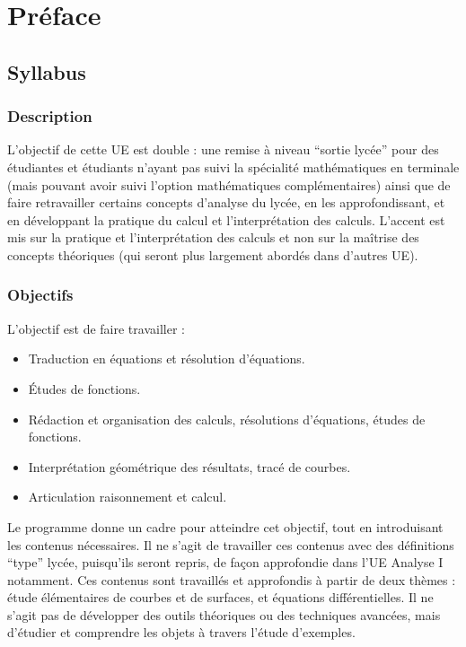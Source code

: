
\chapter*{Préface}


\section*{Syllabus}

\subsection*{Description}

L’objectif de cette UE est double : une remise à niveau “sortie lycée” pour des étudiantes
et étudiants n’ayant pas suivi la spécialité mathématiques en terminale (mais pouvant avoir
suivi l’option mathématiques complémentaires) ainsi que de faire retravailler certains concepts
d’analyse du lycée, en les approfondissant, et en développant la pratique du calcul et 
l’interprétation des calculs. L’accent est mis sur la pratique et l’interprétation des calculs et non
sur la maîtrise des concepts théoriques (qui seront plus largement abordés dans d’autres UE).

\subsection*{Objectifs}

L’objectif est de faire travailler :
\begin{itemize}
	\item Traduction en équations et résolution d’équations.
	\item Études de fonctions.
	\item Rédaction et organisation des calculs, résolutions d’équations, études de fonctions.
	\item Interprétation géométrique des résultats, tracé de courbes.
	\item Articulation raisonnement et calcul.
\end{itemize}

Le programme donne un cadre pour atteindre cet objectif, tout en introduisant les 
contenus nécessaires. Il ne s’agit de travailler ces contenus avec des définitions “type” lycée, 
puisqu’ils seront repris, de façon approfondie dans l’UE Analyse I notamment.
Ces contenus sont travaillés et approfondis à partir de deux thèmes : étude élémentaires
de courbes et de surfaces, et équations différentielles.
Il ne s’agit pas de développer des outils théoriques ou des techniques avancées, mais
d’étudier et comprendre les objets à travers l’étude d’exemples.

